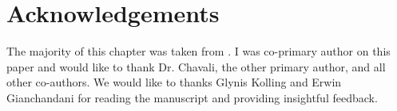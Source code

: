 \section{Acknowledgements}
The majority of this chapter was taken from
. I was co-primary author
on this paper and would like to thank Dr. Chavali, the other
primary author, and all other co-authors.
We would like to thanks Glynis Kolling and Erwin 
Gianchandani for reading the manuscript and providing 
insightful feedback.


